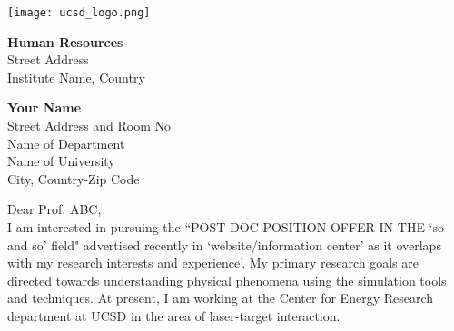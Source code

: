 \documentclass[11pt,a4paper]{revtex4-1}
\begin{document}
\pagestyle{empty}
\hspace*{-.302in}
\texttt{[image: ucsd\_logo.png]}
\vspace{.3in}
\begin{minipage}{.5\linewidth}
\begin{flushleft}                           
\textbf{Human Resources} \\
\vspace{-.1in}
Street Address \\
\vspace{-.1in}
Institute Name, Country\\
\end{flushleft} 
\end{minipage}
\hfill
\begin{minipage}{.5\linewidth}
\begin{flushright} 
\vspace{-.1in}   
\color{blue!10!black}\textbf{Your Name}  \\
\vspace{-.1in}
Street Address and  Room No \\
\vspace{-.1in}
Name of Department \\
\vspace{-.1in}
Name of University\\
\vspace{-.1in}
City, Country-Zip Code \\
\end{flushright} 
\end{minipage} 
Dear  Prof. ABC, \\
I am interested in pursuing the ``POST-DOC POSITION OFFER IN THE `so and so' field" advertised recently in `website/information center' as it overlaps with my research interests and experience'.  My primary research goals are directed towards understanding physical phenomena using the simulation tools and techniques.  At present, I am working at the Center for Energy Research department at UCSD in the area of laser-target interaction. 
\end{document}
